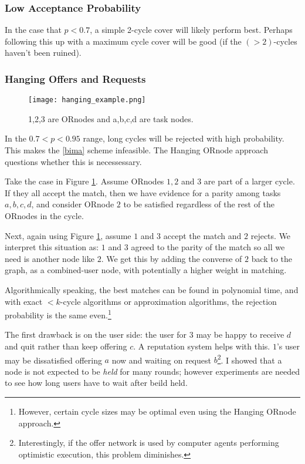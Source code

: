\documentclass[main.tex]{subfiles}
\begin{document}
\subsubsection{Low Acceptance Probability}
In the case that $p < 0.7$, a simple 2-cycle cover will likely perform best. Perhaps following this up with a maximum cycle cover will be good (if the $(>2)$-cycles haven't been ruined).

\subsubsection{Hanging Offers and Requests}
\begin{figure}
  \texttt{[image: hanging\_example.png]}
  \caption{1,2,3 are ORnodes and a,b,c,d are task nodes.}
  \label{hanging_example}
\end{figure}

In the $0.7 < p < 0.95$ range, long cycles will be rejected with high probability. This makes the \ref{bima} scheme infeasible. The Hanging ORnode approach questions whether this is necessessary.

Take the case in Figure \ref{hanging_example}. Assume ORnodes $1,2$ and $3$ are part of a larger cycle. If they all accept the match, then we have evidence for a parity among tasks $a,b,c,d$, and consider ORnode $2$ to be satisfied regardless of the rest of the ORnodes in the cycle.

Next, again using Figure \ref{hanging_example}, assume $1$ and $3$ accept the match and $2$ rejects. We interpret this situation as: $1$ and $3$ agreed to the parity of the match so all we need is another node like $2$. We get this by adding the converse of $2$ back to the graph, as a combined-user node, with potentially a higher weight in matching.

Algorithmically speaking, the best matches can be found in polynomial time, and with exact $<k$-cycle algorithms or approximation algorithms, the rejection probability is the same even.\footnote{However, certain cycle sizes may be optimal even using the Hanging ORnode approach.}

The first drawback is on the user side: the user for $3$ may be happy to receive $d$ and quit rather than keep offering $c$. A reputation system helps with this. $1$'s user may be dissatisfied offering $a$ now and waiting on request $b$\footnote{Interestingly, if the offer network is used by computer agents performing optimistic execution, this problem diminishes.}. I showed that a node is not expected to be \textit{held} for many rounds; however experiments are needed to see how long users have to wait after beild held.
\end{document}
